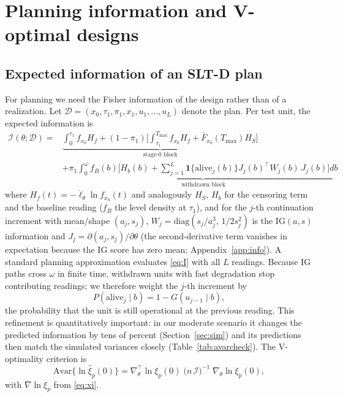 \documentclass[11pt]{article}
\newcommand{\tmax}{T_{\max}}
\newcommand{\Asvar}{\mathrm{Avar}}
\newcommand{\ind}[1]{\mathbf{1}\{#1\}}
\newcommand{\SLTD}{SLT-D}
\begin{document}
\section{Planning information and V-optimal designs}\label{sec:design}

\subsection{Expected information of an \SLTD{} plan}

For planning we need the Fisher information of the design rather than of a realization.
Let $\mathcal{D}=(x_0,\tau_1,\pi_1,x_1,u_1,\dots,u_L)$ denote the plan. Per test unit, the
expected information is
\begin{equation}\label{eq:I}
\begin{split}
\mathcal{I}(\theta;\mathcal{D})={}&
\underbrace{\int_0^{\tau_1}\!\! f_{x_0} H_f
+(1-\pi_1)\Big[\int_{\tau_1}^{\tmax}\!\! f_{x_0} H_f+\bar F_{x_0}(\tmax)H_S\Big]}_{\text{stage-0 block}}\\
&+\underbrace{\pi_1\!\int_0^{\omega}\!\! f_B(b)\Big[H_b(b)+\sum_{j=1}^{L}\ind{\text{alive}_j(b)}
J_j(b)^{\!\top} W_j(b)\, J_j(b)\Big]db}_{\text{withdrawn block}}
\end{split}
\end{equation}
where $H_f(t)=-\ddot{\ell}_\theta\ln f_{x_0}(t)$ and analogously $H_S$, $H_b$ for the censoring
term and the baseline reading ($f_B$ the level density at $\tau_1$), and for the $j$-th
continuation increment with mean/shape $(a_j,s_j)$, $W_j=\mathrm{diag}(s_j/a_j^{3},\,1/2s_j^{2})$
is the IG$(a,s)$ information and $J_j=\partial(a_j,s_j)/\partial\theta$ (the second-derivative
term vanishes in expectation because the IG score has zero mean; Appendix~\ref{app:info}).
A standard planning approximation evaluates \eqref{eq:I} with all $L$ readings. Because IG paths
cross $\omega$ in finite time, withdrawn units with fast degradation stop contributing readings;
we therefore weight the $j$-th increment by
\begin{equation}\label{eq:alive}
P(\text{alive}_j\mid b)=1-G(u_{j-1}\mid b),
\end{equation}
the probability that the unit is still operational at the previous reading. This refinement is
quantitatively important: in our moderate scenario it changes the predicted information by tens
of percent (Section~\ref{sec:sim}) and its predictions then match the simulated variances
closely (Table~\ref{tab:avarcheck}). The V-optimality criterion is
\begin{equation}\label{eq:V}
\Asvar\{\ln\hat\xi_p(0)\}=\nabla_\theta^{\top}\ln\xi_p(0)\;\big(n\,\mathcal{I}\big)^{-1}\;\nabla_\theta\ln\xi_p(0),
\end{equation}
with $\nabla\ln\xi_p$ from \eqref{eq:xi}.
\end{document}
